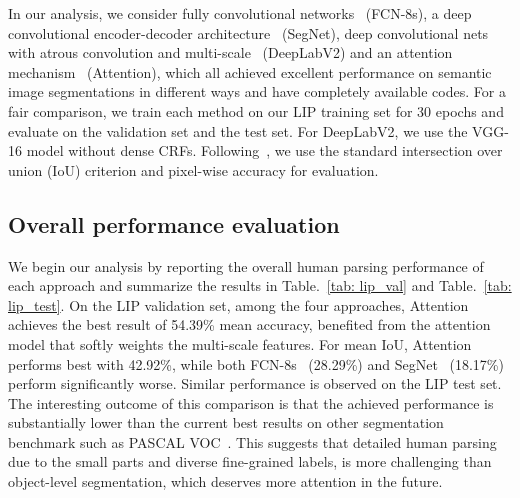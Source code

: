 \documentclass[10pt,twocolumn,letterpaper]{article}
\begin{document}
In our analysis, we consider fully convolutional networks~\cite{long2014fully} (FCN-8s), a deep convolutional encoder-decoder architecture~\cite{badrinarayanan2015segnet} (SegNet), deep convolutional nets with atrous convolution and multi-scale~\cite{chen2014semantic} (DeepLabV2) and an attention mechanism~\cite{chen2015attention} (Attention), which all achieved excellent performance on semantic image segmentations in different ways and have completely available codes. For a fair comparison, we train each method on our LIP training set for 30 epochs and evaluate on the validation set and the test set. For DeepLabV2, we use the VGG-16 model without dense CRFs. Following~\cite{chen2015attention,xia2015zoom}, we use the standard intersection over union (IoU) criterion and pixel-wise accuracy for evaluation.
\subsection{Overall performance evaluation}
We begin our analysis by reporting the overall human parsing performance of each approach and summarize the results in Table.~\ref{tab: lip_val} and Table.~\ref{tab: lip_test}. On the LIP validation set, among the four approaches, Attention~\cite{chen2015attention} achieves the best result of 54.39\% mean accuracy, benefited from the attention model that softly weights the multi-scale features. For mean IoU, Attention~\cite{chen2015attention} performs best with 42.92\%, while both FCN-8s~\cite{long2014fully} (28.29\%) and SegNet~\cite{badrinarayanan2015segnet} (18.17\%) perform significantly worse. Similar performance is observed on the LIP test set. The interesting outcome of this comparison is that the achieved performance is substantially lower than the current best results on other segmentation benchmark such as PASCAL VOC~\cite{everingham2012pascal}. This suggests that detailed human parsing due to the small parts and diverse fine-grained labels, is more challenging than object-level segmentation, which deserves more attention in the future.
\end{document}
